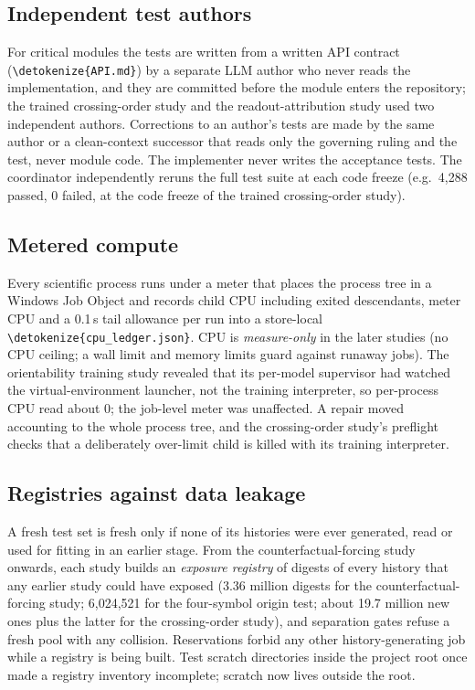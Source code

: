 \documentclass[11pt,a4paper]{article}
\DeclareRobustCommand{\_}{\ifmmode\origunderscore\else\textunderscore\allowbreak\fi}
\DeclareRobustCommand{\fpath}[1]{\begingroup\small\expandafter\nolinkurl\expandafter{\detokenize{#1}}\endgroup}
\begin{document}
\subsection{Independent test authors}
For critical modules the tests are written from a written API contract (\fpath{API.md}) by a
separate LLM author who never reads the implementation, and they are committed before the module enters the
repository; the trained crossing-order study and the readout-attribution study used two
independent authors. Corrections to an author's tests are
made by the same author or a clean-context successor that reads only the governing ruling and
the test, never module code. The implementer never writes the acceptance tests.
The coordinator independently reruns the full test suite at each code freeze (e.g.\ 4,288 passed,
0 failed, at the code freeze of the trained crossing-order study).

\subsection{Metered compute}
Every scientific process runs under a meter that places the process tree in a Windows Job
Object and records child CPU including exited descendants, meter CPU and a 0.1\,s tail
allowance per run into a store-local \fpath{cpu_ledger.json}. CPU is \emph{measure-only} in the
later studies (no CPU ceiling; a wall limit and memory limits guard against runaway jobs).
The orientability training study revealed that its per-model supervisor had watched the
virtual-environment launcher, not the training interpreter, so per-process CPU read about 0;
the job-level meter was unaffected. A repair moved accounting to the whole process tree, and
the crossing-order study's preflight checks that a deliberately over-limit child is killed with
its training interpreter.

\subsection{Registries against data leakage}
A fresh test set is fresh only if none of its histories were ever generated, read or used for
fitting in an earlier stage. From the counterfactual-forcing study onwards, each study builds an
\emph{exposure registry} of digests of every history that any earlier study could have exposed
(3.36 million digests for the counterfactual-forcing study; 6,024,521 for the four-symbol origin
test; about 19.7 million new ones plus the latter for the crossing-order study), and separation
gates refuse a fresh pool with any collision. Reservations forbid any other history-generating
job while a registry is being built. Test scratch directories inside the project root once made
a registry inventory incomplete; scratch now lives outside the root.
\end{document}

